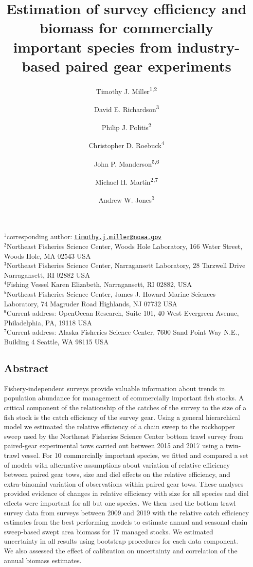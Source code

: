 \documentclass[
  12pt,
]{article}
\title{Estimation of survey efficiency and biomass for commercially
important species from industry-based paired gear experiments}
\author{Timothy J. Miller\textsuperscript{1,2} \and David E.
Richardson\textsuperscript{3} \and Philip J.
Politis\textsuperscript{2} \and Christopher D.
Roebuck\textsuperscript{4} \and John P.
Manderson\textsuperscript{5,6} \and Michael H.
Martin\textsuperscript{2,7} \and Andrew W. Jones\textsuperscript{3}}
\date{}
\begin{document}
\maketitle

\(^1\)corresponding author:
\href{mailto:timothy.j.miller@noaa.gov}{\nolinkurl{timothy.j.miller@noaa.gov}}\\
\(^2\)Northeast Fisheries Science Center, Woods Hole Laboratory, 166
Water Street, Woods Hole, MA 02543 USA\\
\(^3\)Northeast Fisheries Science Center, Narragansett Laboratory, 28
Tarzwell Drive Narragansett, RI 02882 USA\\
\(^4\)Fishing Vessel Karen Elizabeth, Narragansett, RI 02882, USA\\
\(^5\)Northeast Fisheries Science Center, James J. Howard Marine
Sciences Laboratory, 74 Magruder Road Highlands, NJ 07732 USA\\
\(^6\)Current address: OpenOcean Research, Suite 101, 40 West Evergreen
Avenue, Philadelphia, PA, 19118 USA\\
\(^7\)Current address: Alaska Fisheries Science Center, 7600 Sand Point
Way N.E., Building 4 Seattle, WA 98115 USA

\pagebreak

\hypertarget{abstract}{%
\subsection*{Abstract}\label{abstract}}

Fishery-independent surveys provide valuable information about trends in
population abundance for management of commercially important fish
stocks. A critical component of the relationship of the catches of the
survey to the size of a fish stock is the catch efficiency of the survey
gear. Using a general hierarchical model we estimated the relative
efficiency of a chain sweep to the rockhopper sweep used by the
Northeast Fisheries Science Center bottom trawl survey from paired-gear
experimental tows carried out between 2015 and 2017 using a twin-trawl
vessel. For 10 commercially important species, we fitted and compared a
set of models with alternative assumptions about variation of relative
efficiency between paired gear tows, size and diel effects on the
relative efficiency, and extra-binomial variation of observations within
paired gear tows. These analyses provided evidence of changes in
relative efficiency with size for all species and diel effects were
important for all but one species. We then used the bottom trawl survey
data from surveys between 2009 and 2019 with the relative catch
efficiency estimates from the best performing models to estimate annual
and seasonal chain sweep-based swept area biomass for 17 managed stocks.
We estimated uncertainty in all results using bootstrap procedures for
each data component. We also assessed the effect of calibration on
uncertainty and correlation of the annual biomass estimates.
\end{document}
